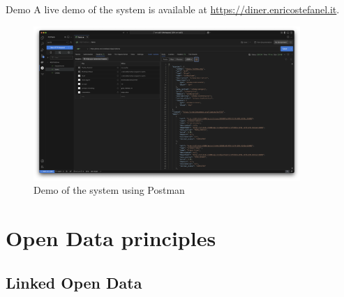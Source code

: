 \begin{frame}{Demo}
	A live demo of the system is available at \url{https://diner.enricostefanel.it}.

	\begin{figure}
		\centering
		\includegraphics[width=0.9\textwidth,height=0.6\textheight,keepaspectratio]{images/postman.png}
		\vspace*{-1\baselineskip}
		\caption{Demo of the system using Postman}
		\label{fig:demo}
	\end{figure}
\end{frame}


\section{Open Data principles}

\subsection{Linked Open Data}

